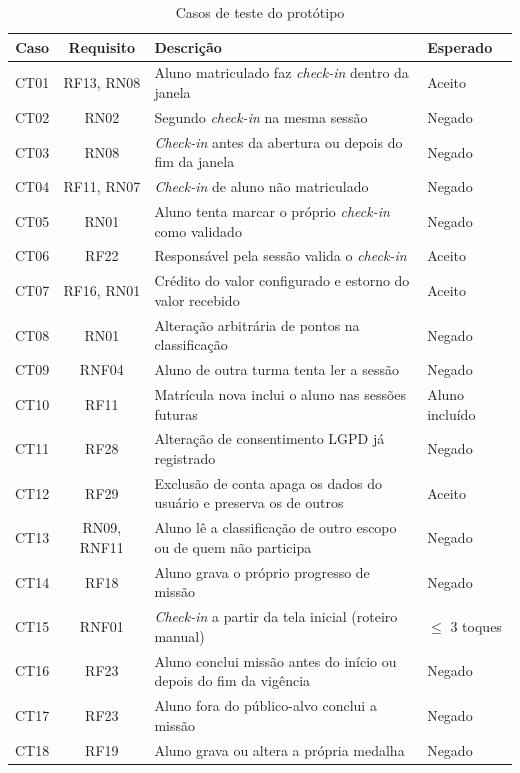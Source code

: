 \begin{table}[H]
  \centering
  \caption{Casos de teste do protótipo}
  \label{tab:testes}
  \footnotesize
  \begin{tabular}{ccp{6.0cm}p{3.2cm}}
    \toprule
    \textbf{Caso} & \textbf{Requisito} & \textbf{Descrição} & \textbf{Esperado} \\
    \midrule
    CT01 & RF13, RN08 & Aluno matriculado faz \textit{check-in} dentro da janela & Aceito \\
    CT02 & RN02 & Segundo \textit{check-in} na mesma sessão & Negado \\
    CT03 & RN08 & \textit{Check-in} antes da abertura ou depois do fim da janela & Negado \\
    CT04 & RF11, RN07 & \textit{Check-in} de aluno não matriculado & Negado \\
    CT05 & RN01 & Aluno tenta marcar o próprio \textit{check-in} como validado & Negado \\
    CT06 & RF22 & Responsável pela sessão valida o \textit{check-in} & Aceito \\
    CT07 & RF16, RN01 & Crédito do valor configurado e estorno do valor recebido & Aceito \\
    CT08 & RN01 & Alteração arbitrária de pontos na classificação & Negado \\
    CT09 & RNF04 & Aluno de outra turma tenta ler a sessão & Negado \\
    CT10 & RF11 & Matrícula nova inclui o aluno nas sessões futuras & Aluno incluído \\
    CT11 & RF28 & Alteração de consentimento LGPD já registrado & Negado \\
    CT12 & RF29 & Exclusão de conta apaga os dados do usuário e preserva os de outros & Aceito \\
    CT13 & RN09, RNF11 & Aluno lê a classificação de outro escopo ou de quem não participa & Negado \\
    CT14 & RF18 & Aluno grava o próprio progresso de missão & Negado \\
        CT15 & RNF01 & \textit{Check-in} a partir da tela inicial (roteiro manual) & $\leq$ 3 toques \\
    CT16 & RF23 & Aluno conclui missão antes do início ou depois do fim da vigência & Negado \\
    CT17 & RF23 & Aluno fora do público-alvo conclui a missão & Negado \\
    CT18 & RF19 & Aluno grava ou altera a própria medalha & Negado \\

\end{tabular}
\end{table}

